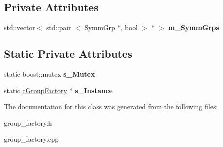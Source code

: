 \subsection*{\-Private \-Attributes}
\begin{DoxyCompactItemize}
\item 
\hypertarget{classcGroupFactory_a971617f9dd69295a27aede82781d3a8e}{
std\-::vector$<$ std\-::pair\*
$<$ \-Symm\-Grp $\ast$, bool $>$ $\ast$ $>$ {\bfseries m\-\_\-\-Symm\-Grps}}
\label{classcGroupFactory_a971617f9dd69295a27aede82781d3a8e}

\end{DoxyCompactItemize}
\subsection*{\-Static \-Private \-Attributes}
\begin{DoxyCompactItemize}
\item 
\hypertarget{classcGroupFactory_abc9e8708326d158987ac8665b672be25}{
static boost\-::mutex {\bfseries s\-\_\-\-Mutex}}
\label{classcGroupFactory_abc9e8708326d158987ac8665b672be25}

\item 
\hypertarget{classcGroupFactory_aee9b5a04dd76633ef13aa16caa9ad310}{
static \hyperlink{classcGroupFactory}{c\-Group\-Factory} $\ast$ {\bfseries s\-\_\-\-Instance}}
\label{classcGroupFactory_aee9b5a04dd76633ef13aa16caa9ad310}

\end{DoxyCompactItemize}


\-The documentation for this class was generated from the following files\-:\begin{DoxyCompactItemize}
\item 
group\-\_\-factory.\-h\item 
group\-\_\-factory.\-cpp\end{DoxyCompactItemize}
